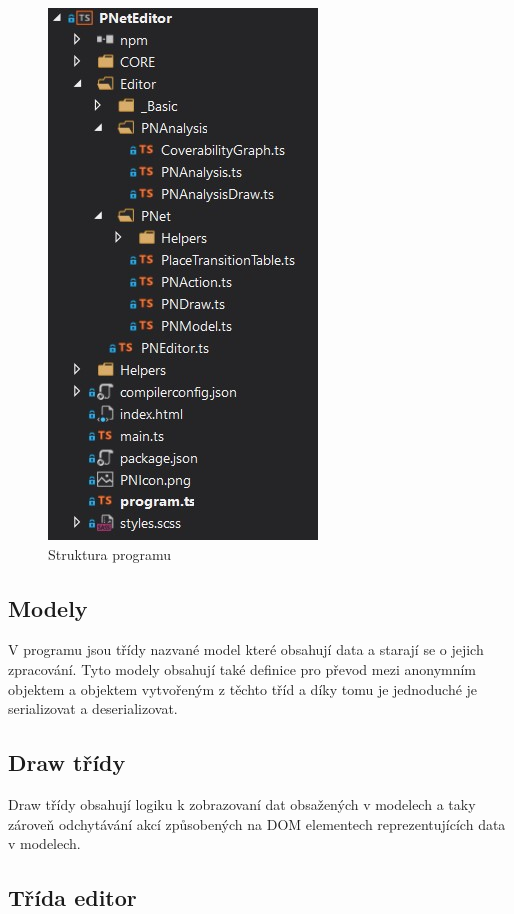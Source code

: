 \documentclass[
  biblatex,
  glossaries,
  index
]{kidiplom}
\begin{document}
\begin{figure}
  \centering
  \includegraphics[scale=1]{struktura_programu}
  \caption{Struktura programu}\label{Struktura programu}
\end{figure}

\subsection{Modely}\label{Modely}

V programu jsou třídy nazvané model které obsahují data a starají se o jejich zpracování.
Tyto modely obsahují také definice pro převod mezi anonymním objektem a objektem 
vytvořeným z těchto tříd a díky tomu je jednoduché je serializovat a deserializovat.

\subsection{Draw třídy}\label{Modely}

Draw třídy obsahují logiku k zobrazovaní dat obsažených v modelech a taky
zároveň odchytávání akcí způsobených na DOM elementech reprezentujících 
data v modelech.

\subsection{Třída editor}\label{Modely}
\end{document}
